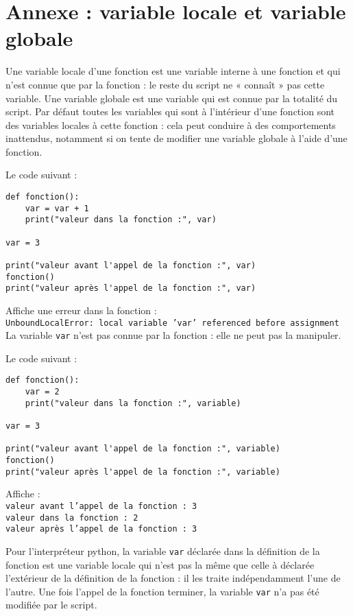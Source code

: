 \newpage

\section*{Annexe : variable locale et variable globale}

Une variable locale d'une fonction est une variable interne à une fonction et qui n'est connue que par la fonction : le reste du script ne « connaît » pas cette variable. Une variable globale est une variable qui est connue par la totalité du script. Par défaut toutes les variables qui sont à l'intérieur d'une fonction sont des variables locales à cette fonction : cela peut conduire à des comportements inattendus, notamment si on tente de modifier une variable globale à l'aide d'une fonction.

\begin{boxedminipage}{\textwidth}
Le code suivant :
\begin{verbatim}
def fonction():
    var = var + 1
    print("valeur dans la fonction :", var)

var = 3

print("valeur avant l'appel de la fonction :", var)
fonction()
print("valeur après l'appel de la fonction :", var)
\end{verbatim}
Affiche une erreur dans la fonction :\\
\texttt{UnboundLocalError: local variable 'var' referenced before assignment}\\La variable \texttt{var} n'est pas connue par la fonction : elle ne peut pas la manipuler.
\end{boxedminipage}


\begin{boxedminipage}{\textwidth}
Le code suivant :
\begin{verbatim}
def fonction():
    var = 2
    print("valeur dans la fonction :", variable)

var = 3

print("valeur avant l'appel de la fonction :", variable)
fonction()
print("valeur après l'appel de la fonction :", variable)
\end{verbatim}
Affiche :\\
\texttt{valeur avant l'appel de la fonction : 3}\\
\texttt{valeur dans la fonction : 2}\\
\texttt{valeur après l'appel de la fonction : 3}

Pour l'interpréteur python, la variable \texttt{var} déclarée dans la définition de la fonction est une variable locale qui n'est pas la même que celle à déclarée l'extérieur de la définition de la fonction : il les traite indépendamment l'une de l'autre. Une fois l'appel de la fonction terminer, la variable \texttt{var} n'a pas été modifiée par le script.
\end{boxedminipage}

